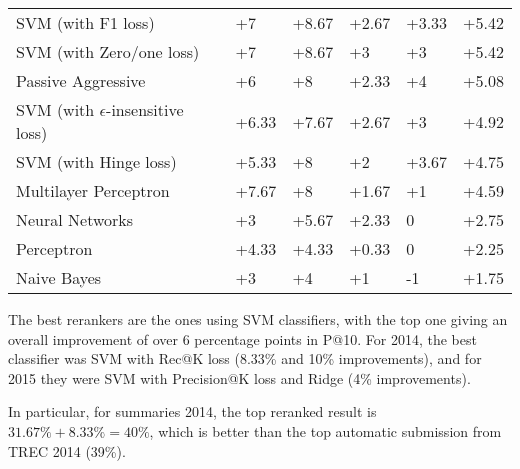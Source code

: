 \begin{table}[h]
{\begin{tabular}{@{}llllll@{}}
SVM (with F1 loss)                                       & +7                       & +8.67                       & +2.67                    & +3.33                       & +5.42             \\ 
SVM (with Zero/one loss)                                        & +7                       & +8.67                       & +3                       & +3                          & +5.42             \\ 
Passive Aggressive                             & +6                       & +8                          & +2.33                    & +4                          & +5.08             \\ 
SVM (with $\epsilon$-insensitive loss)                            & +6.33                    & +7.67                       & +2.67                    & +3                          & +4.92             \\ 
SVM (with Hinge loss)                                     & +5.33                    & +8                          & +2                       & +3.67                       & +4.75             \\ 
Multilayer Perceptron                           & +7.67                    & +8                          & +1.67                    & +1                          & +4.59             \\ 
Neural Networks                               & +3                       & +5.67                       & +2.33                    & 0                          & +2.75             \\ 
Perceptron                                      & +4.33                    & +4.33                       & +0.33                    & 0                          & +2.25             \\ 
Naive Bayes                                      & +3                       & +4                          & +1                       & -1                         & +1.75             \\ \bottomrule
\end{tabular}%
}
\end{table}

The best rerankers are the ones using SVM classifiers, with the top one giving an overall improvement of over 6 percentage
points in P@10. For 2014, the best classifier was SVM with Rec@K loss (8.33\% and 10\% improvements), 
and for 2015 they were SVM with Precision@K loss and Ridge (4\% improvements).

In particular, for summaries 2014, the top reranked result is $31.67\%+8.33\% = 40\%$, which is better than the top automatic submission
from TREC 2014 (39\%).

